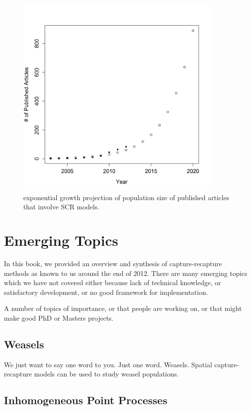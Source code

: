 \begin{figure}[ht]
\centering
\includegraphics[width=4in,height=4in]{Ch20-Last/exp_growth.png}
\caption{
exponential growth projection of population size of published articles
that involve SCR models. 
}
\label{last.fig.expgrowth}
\end{figure}




\section{Emerging Topics}


In this book, 
we provided an overview and synthesis of capture-recapture methods as
known to
us 
around the end of 2012. There 
are many emerging topics which we have not covered either because lack
of technical knowledge, or satisfactory development, or no good
framework for implementation.

A number of topics of importance, or that people are working on, or
that might make good PhD or Masters projects.

\subsection{Weasels}

We just want to say one word to you. Just one word. Weasels. Spatial
capture-recapture models can be used to study weasel populations.


\subsection{Inhomogeneous Point Processes}

